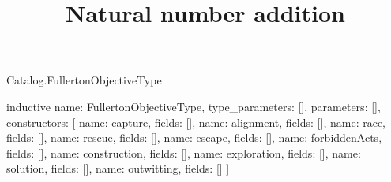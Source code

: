 \begin{lexlean}{Catalog.FullertonObjectiveType}
\title{Natural number addition}
\begin{semanticmodule}
inductive{
  name: FullertonObjectiveType,
  type_parameters: [],
  parameters: [],
  constructors: [
    {name: capture, fields: []},
    {name: alignment, fields: []},
    {name: race, fields: []},
    {name: rescue, fields: []},
    {name: escape, fields: []},
    {name: forbiddenActs, fields: []},
    {name: construction, fields: []},
    {name: exploration, fields: []},
    {name: solution, fields: []},
    {name: outwitting, fields: []}
  ]
}
\end{semanticmodule}
\end{lexlean}
